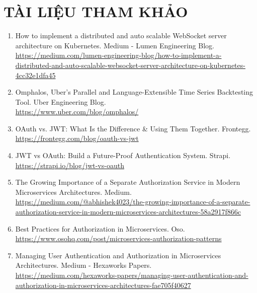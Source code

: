 
    \section*{TÀI LIỆU THAM KHẢO}

    \begin{enumerate}
        \item How to implement a distributed and auto scalable WebSocket server architecture on Kubernetes. Medium - Lumen Engineering Blog.\\
        \url{https://medium.com/lumen-engineering-blog/how-to-implement-a-distributed-and-auto-scalable-websocket-server-architecture-on-kubernetes-4cc32e1dfa45}
        
        \item Omphalos, Uber's Parallel and Language-Extensible Time Series Backtesting Tool. Uber Engineering Blog.\\
        \url{https://www.uber.com/blog/omphalos/}
        
        \item OAuth vs. JWT: What Is the Difference \& Using Them Together. Frontegg.\\
        \url{https://frontegg.com/blog/oauth-vs-jwt}
        
        \item JWT vs OAuth: Build a Future-Proof Authentication System. Strapi.\\
        \url{https://strapi.io/blog/jwt-vs-oauth}
        
        \item The Growing Importance of a Separate Authorization Service in Modern Microservices Architectures. Medium.\\
        \url{https://medium.com/@abhishek4023/the-growing-importance-of-a-separate-authorization-service-in-modern-microservices-architectures-58a2917f866c}
        
        \item Best Practices for Authorization in Microservices. Oso.\\
        \url{https://www.osohq.com/post/microservices-authorization-patterns}
        
        \item Managing User Authentication and Authorization in Microservices Architectures. Medium - Hexaworks Papers.\\
        \url{https://medium.com/hexaworks-papers/managing-user-authentication-and-authorization-in-microservices-architectures-fae705f40627}
        

\end{enumerate}
